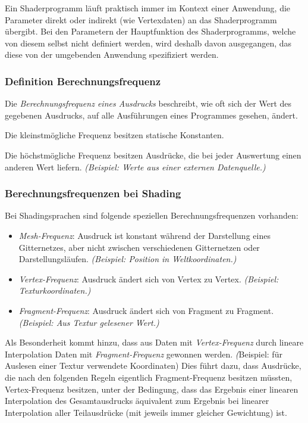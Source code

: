 \documentclass[twoside,a4paper,fleqn,12pt]{article}
\begin{document}
Ein Shaderprogramm läuft praktisch immer im Kontext einer Anwendung, die Parameter direkt oder indirekt (wie
Vertexdaten) an das Shaderprogramm übergibt.
Bei den Parametern der Hauptfunktion des Shaderprogramms, welche von diesem selbst nicht definiert werden,
wird deshalb davon ausgegangen, das diese von der umgebenden Anwendung spezifiziert werden.

\subsubsection{Definition Berechnungsfrequenz}
\label{Berechnungsfrequenz}

Die \emph{Berechnungsfrequenz eines Ausdrucks} beschreibt, wie oft sich der Wert des gegebenen Ausdrucks, auf alle Ausführungen eines
Programmes gesehen, ändert.

Die kleinstmögliche Frequenz besitzen statische Konstanten.

Die höchstmögliche Frequenz besitzen Ausdrücke, die bei jeder Auswertung einen anderen Wert liefern.
\emph{(Beispiel: Werte aus einer externen Datenquelle.)}

\subsubsection{Berechnungsfrequenzen bei Shading}

Bei Shadingsprachen sind folgende speziellen Berechnungsfrequenzen vorhanden:
\begin{itemize}
\item \emph{Mesh-Frequenz}: Ausdruck ist konstant während der Darstellung eines Gitternetzes, aber nicht zwischen
verschiedenen Gitternetzen oder Darstellungsläufen. \emph{(Beispiel: Position in Weltkoordinaten.)}
\item \emph{Vertex-Frequenz}: Ausdruck ändert sich von Vertex zu Vertex. \emph{(Beispiel: Texturkoordinaten.)}
\item \emph{Fragment-Frequenz}: Ausdruck ändert sich von Fragment zu Fragment. \emph{(Beispiel: Aus Textur gelesener Wert.)}
\end{itemize}

Als Besonderheit kommt hinzu, dass aus Daten mit \emph{Vertex-Frequenz} durch lineare Interpolation Daten mit
\emph{Fragment-Frequenz} gewonnen werden. \emph({Beispiel: für Auslesen einer Textur verwendete Koordinaten)}
Dies führt dazu, dass Ausdrücke, die nach den folgenden Regeln
eigentlich Fragment-Frequenz besitzen müssten, Vertex-Frequenz besitzen, unter der Bedingung, dass
das Ergebnis einer linearen Interpolation des Gesamtausdrucks äquivalent zum Ergebnis bei linearer
Interpolation aller Teilausdrücke (mit jeweils immer gleicher Gewichtung) ist.
\end{document}
